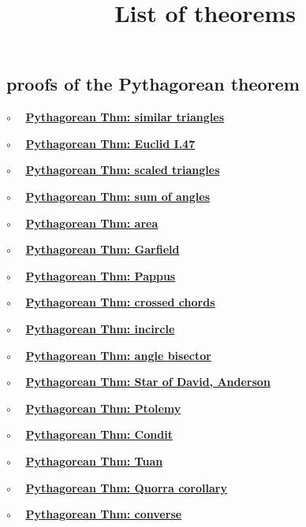 \documentclass[11pt, oneside]{article}
\title{List of theorems}
\date{}
\begin{document}
\maketitle
\Large


\subsection*{proofs of the Pythagorean theorem}

\label{sec:list_Pythagorean_proofs}

$\circ$ \ \ \hyperref[sec:Pythagoras_similar_triangles]{\textbf{Pythagorean Thm:  similar triangles}}

$\circ$ \ \ \hyperref[sec:Euclid_I_47]{\textbf{Pythagorean Thm: Euclid I.47 }}

$\circ$ \ \ \hyperref[sec:Pythagoras_scaled_triangles]{\textbf{Pythagorean Thm:  scaled triangles}}

$\circ$ \ \ \hyperref[sec:pthm_sum_angles]{\textbf{Pythagorean Thm:  sum of angles}}

$\circ$ \ \ \hyperref[sec:Pythagoras_area]{\textbf{Pythagorean Thm:  area}}

$\circ$ \ \ \hyperref[sec:Garfield]{\textbf{Pythagorean Thm: Garfield }}

$\circ$ \ \ \hyperref[sec:PProof_Pappus]{\textbf{Pythagorean Thm:  Pappus}}

$\circ$ \ \ \hyperref[sec:PProof_chords]{\textbf{Pythagorean Thm:  crossed chords}}

$\circ$ \ \ \hyperref[sec:PProof_incircle]{\textbf{Pythagorean Thm:  incircle}}

$\circ$ \ \ \hyperref[sec:PProof_angle_bisector]{\textbf{Pythagorean Thm:  angle bisector}}

$\circ$ \ \ \hyperref[sec:star_of_david]{\textbf{Pythagorean Thm:  Star of David, Anderson}}

$\circ$ \ \ \hyperref[sec:PProof_Ptolemy]{\textbf{Pythagorean Thm: Ptolemy }}

$\circ$ \ \ \hyperref[sec:Condit]{\textbf{Pythagorean Thm:  Condit}}

$\circ$ \ \ \hyperref[sec:Pthm_Tuan]{\textbf{Pythagorean Thm:  Tuan}}

$\circ$ \ \ \hyperref[sec:Quorra]{\textbf{Pythagorean Thm:  Quorra corollary}}

$\circ$ \ \ \hyperref[sec:Pythagorean_theorem_converse]{\textbf{Pythagorean Thm:  converse}}
\end{document}

